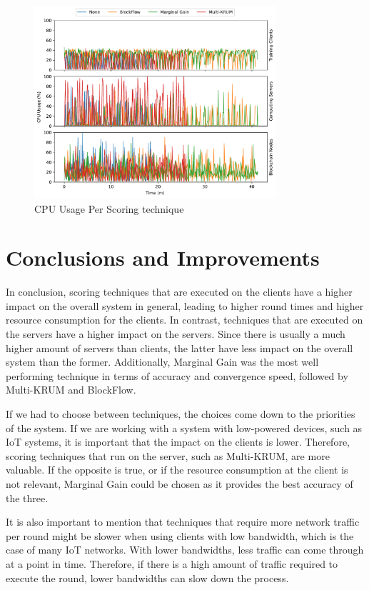 \begin{figure}[!hpb]
    \centering
    \centering
    \includegraphics[width=0.8\textwidth]{graphics/04_scoring_cpu.pdf}
    \caption{CPU Usage Per Scoring technique}
    \label{fig:cpu_scoring}
\end{figure}

\section{Conclusions and Improvements}

In conclusion, scoring techniques that are executed on the clients have a higher impact on the overall system in general, leading to higher round times and higher resource consumption for the clients. In contrast, techniques that are executed on the servers have a higher impact on the servers. Since there is usually a much higher amount of servers than clients, the latter have less impact on the overall system than the former. Additionally, Marginal Gain was the most well performing technique in terms of accuracy and convergence speed, followed by Multi-KRUM and BlockFlow.

If we had to choose between techniques, the choices come down to the priorities of the system. If we are working with a system with low-powered devices, such as IoT systems, it is important that the impact on the clients is lower. Therefore, scoring techniques that run on the server, such as Multi-KRUM, are more valuable. If the opposite is true, or if the resource consumption at the client is not relevant, Marginal Gain could be chosen as it provides the best accuracy of the three.

It is also important to mention that techniques that require more network traffic per round might be slower when using clients with low bandwidth, which is the case of many IoT networks. With lower bandwidths, less traffic can come through at a point in time. Therefore, if there is a high amount of traffic required to execute the round, lower bandwidths can slow down the process.

